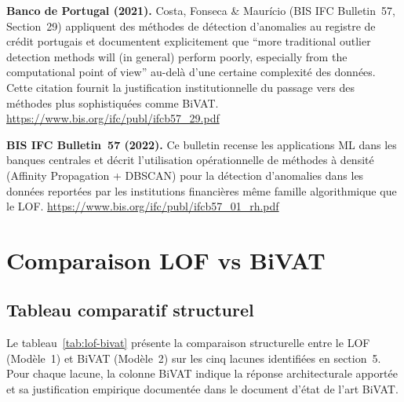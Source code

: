\documentclass[12pt,a4paper]{article}
\begin{document}
\textbf{Banco de Portugal (2021).} Costa, Fonseca \& Maurício (BIS IFC
Bulletin~57, Section~29) appliquent des méthodes de détection d'anomalies
au registre de crédit portugais et documentent explicitement que ``more
traditional outlier detection methods will (in general) perform poorly,
especially from the computational point of view'' au-delà d'une certaine
complexité des données. Cette citation fournit la justification institutionnelle
du passage vers des méthodes plus sophistiquées comme BiVAT.
\url{https://www.bis.org/ifc/publ/ifcb57\_29.pdf}

\textbf{BIS IFC Bulletin~57 (2022).} Ce bulletin recense les applications ML
dans les banques centrales et décrit l'utilisation opérationnelle de méthodes
à densité (Affinity Propagation + DBSCAN) pour la détection d'anomalies dans
les données reportées par les institutions financières  même famille
algorithmique que le LOF.
\url{https://www.bis.org/ifc/publ/ifcb57\_01\_rh.pdf}

\section{Comparaison LOF vs BiVAT}

\subsection{Tableau comparatif structurel}

Le tableau~\ref{tab:lof-bivat} présente la comparaison structurelle entre
le LOF (Modèle~1) et BiVAT (Modèle~2) sur les cinq lacunes identifiées en
section~5. Pour chaque lacune, la colonne BiVAT indique la réponse
architecturale apportée et sa justification empirique documentée dans le
document d'état de l'art BiVAT.
\end{document}
